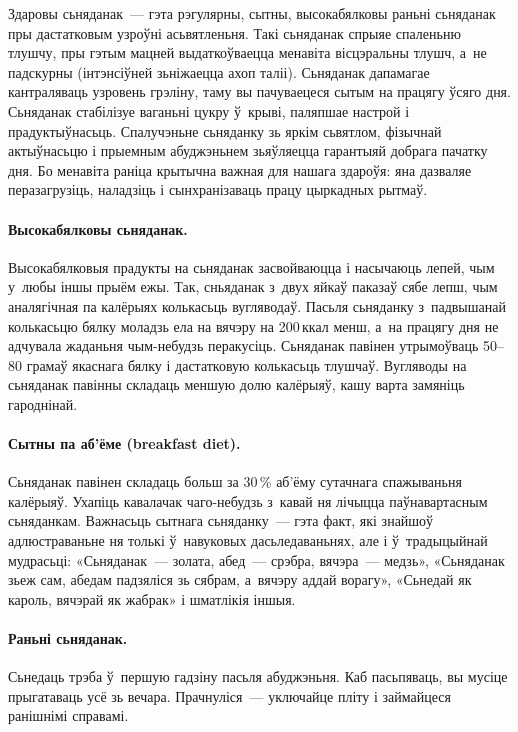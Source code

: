 Здаровы сьняданак~--- гэта рэгулярны, сытны, высокабялковы раньні сьняданак пры дастатковым узроўні асьвятленьня.
Такі сьняданак спрыяе спаленьню тлушчу, пры гэтым мацней выдаткоўваецца менавіта вісцэральны тлушч, а~не падскурны (інтэнсіўней зьніжаецца ахоп таліі). Сьняданак дапамагае кантраляваць узровень грэліну, таму вы пачуваецеся сытым на працягу ўсяго дня. Сьняданак стабілізуе ваганьні цукру ў~крыві, паляпшае настрой і прадуктыўнасьць. Спалучэньне сьняданку зь яркім сьвятлом, фізычнай актыўнасьцю і прыемным абуджэньнем зьяўляецца гарантыяй добрага пачатку дня. Бо менавіта раніца крытычна важная для нашага здароўя: яна дазваляе перазагрузіць, наладзіць і сынхранізаваць працу цыркадных рытмаў.

\paragraph{Высокабялковы сьняданак.}
Высокабялковыя прадукты на сьняданак засвойваюцца і насычаюць лепей, чым у~любы іншы прыём ежы. Так, сньяданак з~двух яйкаў паказаў сябе лепш, чым аналягічная па калёрыях колькасьць вугляводаў. Пасьля сьняданку з~падвышанай колькасьцю бялку моладзь ела на вячэру на 200\,ккал менш, а~на працягу дня не адчувала жаданьня чым-небудзь перакусіць. Сьняданак павінен утрымоўваць 50--80 грамаў якаснага бялку і дастатковую колькасьць тлушчаў. Вугляводы на сьняданак павінны складаць меншую долю калёрыяў, кашу варта замяніць гароднінай.

\paragraph{Сытны па аб'ёме (breakfast diet).}
Сьняданак павінен складаць больш за 30\,\% аб'ёму сутачнага спажываньня калёрыяў. Ухапіць кавалачак чаго-небудзь з~кавай ня лічыцца паўнавартасным сьняданкам. Важнасьць сытнага сьняданку~--- гэта факт, які знайшоў адлюстраваньне ня толькі ў~навуковых дасьледаваньнях, але і ў~традыцыйнай мудрасьці: «Сьняданак~--- золата, абед~--- срэбра, вячэра~--- медзь», «Сьняданак зьеж сам, абедам падзяліся зь сябрам, а~вячэру аддай ворагу», «Сьнедай як кароль, вячэрай як жабрак» і шматлікія іншыя.

\paragraph{Раньні сьняданак.}
Сьнедаць трэба ў~першую гадзіну пасьля абуджэньня. Каб пасьпяваць, вы мусіце прыгатаваць усё зь вечара. Прачнуліся~--- уключайце пліту і займайцеся ранішнімі справамі.

